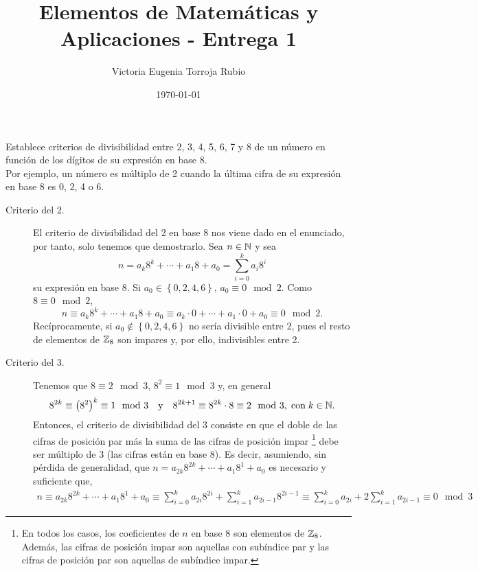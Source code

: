 \documentclass{article}
\begin{document}
\title{Elementos de Matemáticas y Aplicaciones - Entrega 1}
\author{Victoria Eugenia Torroja Rubio}
\date{\today}

\maketitle

\begin{ej}
Establece criterios de divisibilidad entre 2, 3, 4, 5, 6, 7 y 8 de un número en función de los dígitos de su expresión en base 8. \\ 
Por ejemplo, un número es múltiplo de 2 cuando la última cifra de su expresión en base 8 es 0, 2, 4 o 6.
\end{ej}

\begin{sol}
\begin{description}
\item[Criterio del 2.] El criterio de divisibilidad del 2 en base 8 nos viene dado en el enunciado, por tanto, solo tenemos que demostrarlo. Sea $\displaystyle n \in \mathbb{N} $ y sea 
	\[n = a_{k}8^{k} + \cdots + a_{1}8+a_{0} = \sum^{k}_{i=0}a_{i}8^{i} \]
	su expresión en base $\displaystyle 8 $. Si $\displaystyle a_{0} \in \left\{0,2,4,6\right\}  $, $\displaystyle a_{0}\equiv 0 \mod 2 $. Como $\displaystyle 8 \equiv 0 \mod 2 $,
	\[n \equiv a_{k}8^{k} + \cdots + a_{1}8+a_{0} \equiv a_{k} \cdot 0 + \cdots + a_{1} \cdot 0+ a_{0} \equiv 0 \mod 2 .\]
	Recíprocamente, si $\displaystyle a_{0} \not\in \left\{ 0,2,4,6\right\}  $ no sería divisible entre 2, pues el resto de elementos de $\displaystyle \mathbb{Z}_{8} $ son impares y, por ello, indivisibles entre 2.
\item[Criterio del 3.] Tenemos que $\displaystyle 8\equiv 2 \mod 3 $, $\displaystyle 8^{2} \equiv 1\mod 3 $ y, en general
	\[8^{2k} \equiv \left(8^{2}\right)^{k} \equiv 1 \mod 3 \quad \text{y} \quad 8^{2k+1} \equiv 8^{2k} \cdot 8 \equiv 2 \mod 3, \; \text{con} \; k \in \mathbb{N} .\]
Entonces, el criterio de divisibilidad del 3 consiste en que el doble de las cifras de posición par más la suma de las cifras de posición impar \footnote{ En todos los casos, los coeficientes de $\displaystyle n $ en base 8 son elementos de $\displaystyle \mathbb{Z}_{8} $. Además, las cifras de posición impar son aquellas con subíndice par y las cifras de posición par son aquellas de subíndice impar.} debe ser múltiplo de 3 (las cifras están en base 8). Es decir, asumiendo, sin pérdida de generalidad, que $\displaystyle n = a_{2k}8^{2k} + \cdots + a_{1}8^{1} + a_{0} $ es necesario y suficiente que,
\[ 
\begin{split}
n \equiv a_{2k}8^{2k} + \cdots + a_{1}8^{1} + a_{0} \equiv \sum^{k}_{i=0}a_{2i}8^{2i} + \sum^{k}_{i=1}a_{2i-1}8^{2i-1} \equiv \sum^{k}_{i=0}a_{2i} + 2\sum^{k}_{i=1}a_{2i-1} \equiv 0 \mod 3
\end{split}
\]


\end{description}
\end{sol}
\end{document}
